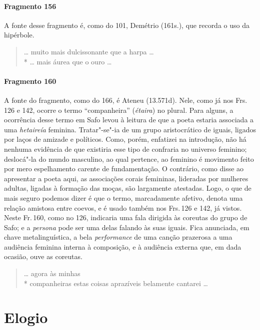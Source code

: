 \paragraph{Fragmento 156}

{\small A fonte desse fragmento é, como do 101, Demétrio (161s.), que recorda o uso da
hipérbole.}

\begin{verse}
\ldots{} muito mais dulcissonante que a harpa \ldots{}\\*
\ldots{} mais áurea que o ouro \ldots{}
\end{verse}

\paragraph{Fragmento 160}

{\small A fonte do fragmento, como do 166, é Ateneu (13.571d). Nele, como já nos Frs.
126 e 142, ocorre o termo ``companheira” (\textit{étaira}) no plural.
Para alguns, a ocorrência desse termo em Safo levou à leitura de que a poeta estaria associada a uma \textit{hetaireía} feminina. Tratar"-se"-ia de um grupo aristocrático de iguais, ligados por laços de amizade e políticos. Como, porém, enfatizei na introdução, não há nenhuma evidência de que existiria esse tipo de confraria no universo feminino; deslocá"-la do mundo masculino, ao qual pertence, ao feminino é movimento feito por mero espelhamento carente de fundamentação. O contrário, como disse ao apresentar a poeta aqui, as associações corais femininas, lideradas por mulheres adultas, ligadas à formação das moças, são largamente atestadas. Logo, o que de mais seguro podemos dizer é que o termo, marcadamente afetivo, denota uma relação amistosa entre coevos, e é usado também nos Frs.\,126 e 142, já vistos. Neste Fr.\,160, como no 126, indicaria uma fala dirigida às coreutas do grupo de Safo; e a \textit{persona} pode ser uma delas falando às suas iguais. Fica anunciada, em chave metalinguística, a bela \textit{performance}
de uma canção prazerosa a uma audiência feminina interna à composição, e à audiência externa que, em dada ocasião, ouve as coreutas.}

\begin{verse}
\ldots{} agora às minhas\\*
companheiras estas coisas aprazíveis belamente cantarei \ldots{}
\end{verse}


\section{Elogio}

